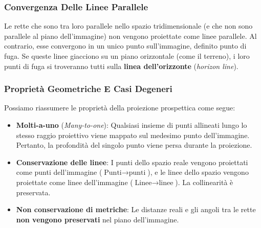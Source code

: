 ﻿\documentclass[11pt, a4paper]{article}
\begin{document}


\subsubsection{Convergenza Delle Linee Parallele}

Le rette che sono tra loro parallele nello spazio tridimensionale (e che non sono parallele al piano dell'immagine) non vengono proiettate come linee parallele. Al contrario, esse convergono in un unico punto sull'immagine, definito punto di fuga. Se queste linee giacciono su un piano orizzontale (come il terreno), i loro punti di fuga si troveranno tutti sulla \textbf{linea dell'orizzonte} (\emph{horizon line}).


\subsubsection{Proprietà Geometriche E Casi Degeneri}

Possiamo riassumere le proprietà della proiezione prospettica come segue:
\begin{itemize}[noitemsep]
    \item \textbf{Molti-a-uno} (\emph{Many-to-one}): Qualsiasi insieme di punti allineati lungo lo stesso raggio proiettivo viene mappato sul medesimo punto dell'immagine. Pertanto, la profondità del singolo punto viene persa durante la proiezione.
    \item \textbf{Conservazione delle linee}: I punti dello spazio reale vengono proiettati come punti dell'immagine ($\text{Punti} \rightarrow \text{punti}$), e le linee dello spazio vengono proiettate come linee dell'immagine ($\text{Linee} \rightarrow \text{linee}$). La collinearità è preservata.
    \item \textbf{Non conservazione di metriche}: Le distanze reali e gli angoli tra le rette \textbf{non vengono preservati} nel piano dell'immagine.
\end{itemize}
\end{document}

